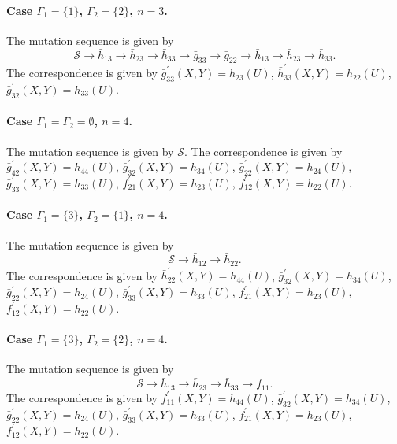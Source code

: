 \paragraph{Case $\Gamma_1 = \{1\}$, $\Gamma_2 = \{2\}$, $n=3$.} The mutation sequence is given by
\begin{equation}
    \mathcal{S} \rightarrow \bar{h}_{13}\rightarrow \bar{h}_{23} \rightarrow \bar{h}_{33}\rightarrow \bar{g}_{33}\rightarrow \bar{g}_{22}\rightarrow \bar{h}_{13}\rightarrow \bar{h}_{23}\rightarrow\bar{h}_{33}.
\end{equation}
The correspondence is given by $\bar{g}_{33}^{\prime}(X,Y) = h_{23}(U)$, $\bar{h}_{33}^{\prime}(X,Y) = h_{22}(U)$, $\bar{g}_{32}^{\prime}(X,Y) = h_{33}(U)$.

\paragraph{Case $\Gamma_1 = \Gamma_2 = \emptyset$, $n=4$.} The mutation sequence is given by $\mathcal{S}$. The correspondence is given by $\bar{g}_{42}^{\prime}(X,Y) = h_{44}(U)$, $\bar{g}_{32}^{\prime}(X,Y) = h_{34}(U)$, $\bar{g}_{22}^{\prime}(X,Y) = h_{24}(U)$, $\bar{g}_{33}^{\prime}(X,Y) = h_{33}(U)$, $f_{21}^{\prime}(X,Y) = h_{23}(U)$, $f_{12}^{\prime}(X,Y) = h_{22}(U)$.

\paragraph{Case $\Gamma_1 = \{3\}$, $\Gamma_2 = \{1\}$, $n=4$.} The mutation sequence is given by
\begin{equation}
    \mathcal{S} \rightarrow \bar{h}_{12}\rightarrow \bar{h}_{22}.
\end{equation}
The correspondence is given by $\bar{h}_{22}^{\prime}(X,Y) = h_{44}(U)$, $\bar{g}_{32}^{\prime}(X,Y) = h_{34}(U)$, $\bar{g}_{22}^{\prime}(X,Y) = h_{24}(U)$, $\bar{g}_{33}^{\prime}(X,Y) = h_{33}(U)$, $f_{21}^{\prime}(X,Y) = h_{23}(U)$, $f_{12}^{\prime}(X,Y) = h_{22}(U)$.

\paragraph{Case $\Gamma_1 = \{3\}$, $\Gamma_2 = \{2\}$, $n=4$.} The mutation sequence is given by
\begin{equation}
    \mathcal{S}\rightarrow \bar{h}_{13}\rightarrow \bar{h}_{23}\rightarrow \bar{h}_{33}\rightarrow f_{11}.
\end{equation}
The correspondence is given by $f_{11}^{\prime}(X,Y) = h_{44}(U)$, $\bar{g}_{32}^{\prime}(X,Y) = h_{34}(U)$, $\bar{g}_{22}^{\prime}(X,Y) = h_{24}(U)$, $\bar{g}_{33}^{\prime}(X,Y) = h_{33}(U)$, $f_{21}^{\prime}(X,Y) = h_{23}(U)$, $f_{12}^{\prime}(X,Y) = h_{22}(U)$.

